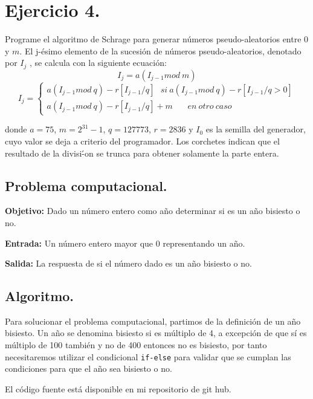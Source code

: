 \documentclass[12pt,letterpaper]{article}
\begin{document}
{\section{Ejercicio 4.}

Programe el algoritmo de Schrage para generar n\'umeros pseudo-aleatorios
entre $0$ y $m$.
El j-\'esimo elemento de la sucesi\'on de n\'umeros pseudo-aleatorios, denotado por $I_j$ , se calcula con la siguiente ecuaci\'on:
$$ I_j = a(I_{j-1} mod \ m) $$
$$I_{j}=\left\lbrace\begin{array}{c} a(I_{j-1} mod \ q)-r[I_{j-1} /q] \ \ \ si \ a(I_{j-1} mod \ q )-r[I_{j-1}/q > 0] \\ a(I_{j-1} mod \ q)-r[I_{j-1} /q] + m \ \ \ \ \ \ \ \ en \ otro \ caso \ \ \ \ \ \ \ \ \  \ \ \ \ \ \end{array}\right.  $$

donde $a = 75$, $m = 2^31-1$, $q = 127773$, $r = 2836$ y $I_0$ es la semilla del generador, cuyo valor se deja a criterio del programador. Los corchetes indican que el resultado de la divisi\'-on se trunca para obtener solamente la parte entera.


\subsection{Problema computacional.}
\textbf{Objetivo:} Dado un n\'umero entero como año determinar si es un año bisiesto o no.

\textbf{Entrada:} Un n\'umero entero mayor que 0 representando un año.

\textbf{Salida:} La respuesta de si el n\'umero dado es un año bisiesto o no.

\subsection{Algoritmo.}
Para solucionar el problema computacional, partimos de la definici\'on de un año bisiesto. Un año se denomina bisiesto si es m\'ultiplo de 4, a excepci\'on de que s\'i es m\'ultiplo de 100 tambi\'en y no de 400 entonces no es bisiesto, por tanto necesitaremos utilizar el condicional \texttt{if-else} para validar que se cumplan las condiciones para que el año sea bisiesto o no.


El código fuente está disponible en mi repositorio de git hub. \cite{url:basilea}

}
\end{document}
